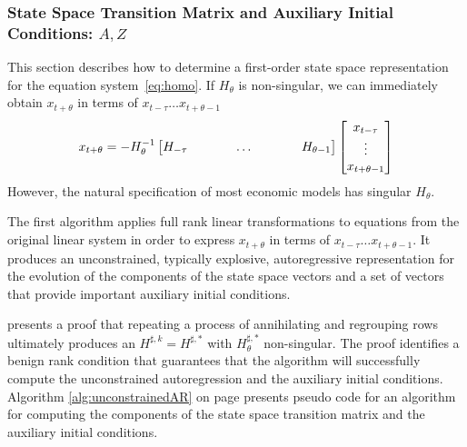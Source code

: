 \documentclass[12pt]{article}
\begin{document}
\subsubsection{State Space Transition Matrix and Auxiliary Initial Conditions: $A, Z$}
\label{sec:arzgev}

This section describes how to determine a first-order state space
representation for the equation system~\ref{eq:homo}. 
If $H_\theta$ is non-singular, we can immediately obtain $x_{t+\theta}$ 
in terms of $x_{t-\tau} \ldots x_{t+\theta-1}$
\begin{gather}
x_{t+\theta} = -  H_{\theta}^{-1}\begin{bmatrix}
    H_{-\tau}&\hspace{0.25in}&\dots&\hspace{0.25in}&H_{\theta-1}
  \end{bmatrix}
  \begin{bmatrix}
    x_{t-\tau} \\ \vdots\\ x_{t+\theta-1}
  \end{bmatrix}
\end{gather}
However, the natural specification of most economic models has singular
 $H_\theta$.

The first  algorithm
applies full rank linear transformations 
to equations from the original linear system in order to express
$x_{t+\theta}$ in terms of $x_{t-\tau} \ldots x_{t+\theta-1}$.
It produces an unconstrained, typically explosive, 
autoregressive representation for the evolution of the components of
the state space vectors and a set of vectors 
that provide important auxiliary initial conditions. 






\label{sec:gfrr}

% 
% 
% 

\cite{anderson10} presents a proof that repeating 
a process of annihilating and regrouping rows ultimately  produces 
an $H^{\sharp,k}=H^{\sharp,\ast}$ with $H^{\sharp,\ast}_\theta$ non-singular.
The proof identifies a benign rank condition 
that guarantees that the algorithm will successfully compute
the unconstrained autoregression and the auxiliary initial conditions.
Algorithm \ref{alg:unconstrainedAR} on page \pageref{alg:unconstrainedAR} presents pseudo code for 
an algorithm for computing the 
components of the state space transition matrix and the auxiliary initial
conditions.
\end{document}
